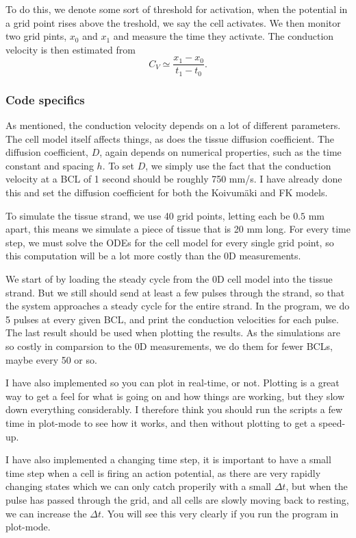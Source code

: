 \documentclass[a4paper, 11pt, notitlepage, english]{article}
\begin{document}
To do this, we denote some sort of threshold for activation, when the potential in a grid point rises above the treshold, we say the cell activates. We then monitor two grid pints, $x_0$ and $x_1$ and measure the time they activate. The conduction velocity is then estimated from
$$C_V \simeq \frac{x_1 - x_0}{t_1 - t_0}.$$

\subsubsection*{Code specifics}

As mentioned, the conduction velocity depends on a lot of different parameters. The cell model itself affects things, as does the tissue diffusion coefficient. The diffusion coefficient, $D$, again depends on numerical properties, such as the time constant and spacing $h$. To set $D$, we simply use the fact that the conduction velocity at a BCL of 1 second should be roughly 750 mm/s. I have already done this and set the diffusion coefficient for both the Koivumäki and FK models.


To simulate the tissue strand, we use 40 grid points, letting each be $0.5$ mm apart, this means we simulate a piece of tissue that is 20 mm long. For every time step, we must solve the ODEs for the cell model for every single grid point, so this computation will be a lot more costly than the 0D measurements.

We start of by loading the steady cycle from the 0D cell model into the tissue strand. But we still should send at least a few pulses through the strand, so that the system approaches a steady cycle for the entire strand. In the program, we do 5 pulses at every given BCL, and print the conduction velocities for each pulse. The last result should be used when plotting the results. As the simulations are so costly in comparsion to the 0D measurements, we do them for fewer BCLs, maybe every 50 or so.

I have also implemented so you can plot in real-time, or not. Plotting is a great way to get a feel for what is going on and how things are working, but they slow down everything considerably. I therefore think you should run the scripts a few time in plot-mode to see how it works, and then without plotting to get a speed-up.

I have also implemented a changing time step, it is important to have a small time step when a cell is firing an action potential, as there are very rapidly changing states which we can only catch properily with a small $\Delta t$, but when the pulse has passed through the grid, and all cells are slowly moving back to resting, we can increase the $\Delta t$. You will see this very clearly if you run the program in plot-mode.
\end{document}
